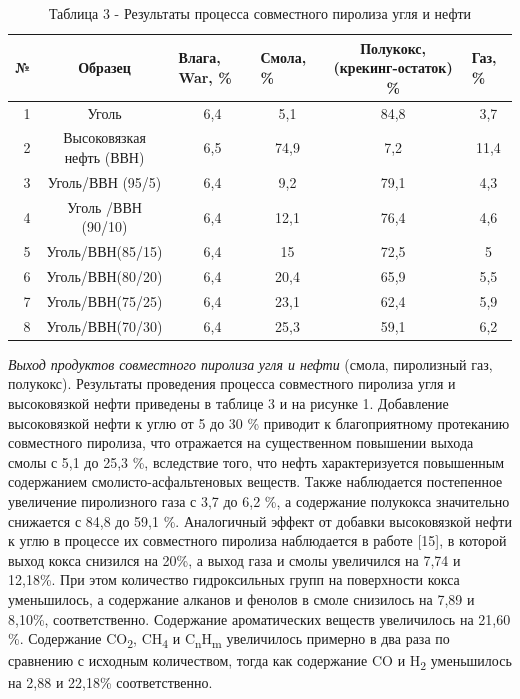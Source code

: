 \begin{table}[H]
\caption*{Таблица 3 - Результаты процесса совместного пиролиза угля и
нефти}
\centering
\begin{tabular}{|r|c|c|c|c|c|}
\hline
\multicolumn{1}{|l|}{№} &
  Образец &
  \multicolumn{1}{l|}{Влага, War, \%} &
  \multicolumn{1}{l|}{Смола, \%} &
  \multicolumn{1}{p{0.21\textwidth}|}{Полукокс, (крекинг-остаток) \%} &
  \multicolumn{1}{l|}{Газ, \%} \\ \hline
1 & Уголь                    & 6,4 & 5,1  & 84,8 & 3,7  \\ \hline
2 & Высоковязкая нефть (ВВН) & 6,5 & 74,9 & 7,2  & 11,4 \\ \hline
3 & Уголь/ВВН (95/5)         & 6,4 & 9,2  & 79,1 & 4,3  \\ \hline
4 & Уголь /ВВН (90/10)       & 6,4 & 12,1 & 76,4 & 4,6  \\ \hline
5 & Уголь/ВВН(85/15)         & 6,4 & 15   & 72,5 & 5    \\ \hline
6 & Уголь/ВВН(80/20)         & 6,4 & 20,4 & 65,9 & 5,5  \\ \hline
7 & Уголь/ВВН(75/25)         & 6,4 & 23,1 & 62,4 & 5,9  \\ \hline
8 & Уголь/ВВН(70/30)         & 6,4 & 25,3 & 59,1 & 6,2  \\ \hline
\end{tabular}
\end{table}

\begin{multicols}{2}
\emph{Выход продуктов совместного пиролиза} \emph{угля и нефти} (смола,
пиролизный газ, полукокс). Результаты проведения процесса совместного
пиролиза угля и высоковязкой нефти приведены в таблице 3 и на рисунке 1.
Добавление высоковязкой нефти к углю от 5 до 30 \% приводит к
благоприятному протеканию совместного пиролиза, что отражается на
существенном повышении выхода смолы с 5,1 до 25,3 \%, вследствие того,
что нефть характеризуется повышенным содержанием смолисто-асфальтеновых
веществ. Также наблюдается постепенное увеличение пиролизного газа с 3,7
до 6,2 \%, а содержание полукокса значительно снижается с 84,8 до 59,1
\%. Аналогичный эффект от добавки высоковязкой нефти к углю в процессе
их совместного пиролиза наблюдается в работе {[}15{]}, в которой выход
кокса снизился на 20\%, а выход газа и смолы увеличился на 7,74 и
12,18\%. При этом количество гидроксильных групп на поверхности кокса
уменьшилось, а содержание алканов и фенолов в смоле снизилось на 7,89 и
8,10\%, соответственно. Содержание ароматических веществ увеличилось на
21,60 \%. Содержание CO\textsubscript{2}, CH\textsubscript{4} и
C\textsubscript{n}H\textsubscript{m} увеличилось примерно в два раза по
сравнению с исходным количеством, тогда как содержание CO и
H\textsubscript{2} уменьшилось на 2,88 и 22,18\% соответственно.
\end{multicols}

